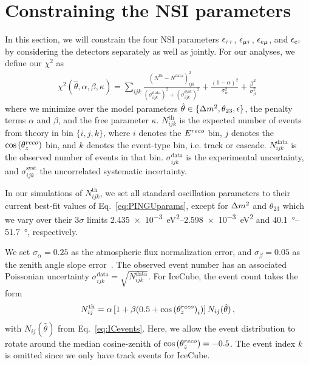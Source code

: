 \section{Constraining the NSI parameters}\label{sec:constraining}
In this section, we will constrain the four NSI parameters $\epsilon_{\tau\tau}$, $\epsilon_{\mu\tau}$, $\epsilon_{e\mu}$, and $\epsilon_{e\tau}$ by considering the detectors separately as well as jointly.
For our analyses, we define our $\chi^2$ as
\begin{align}\label{eq:chisq_NSI}
    \chi^{2}(\hat{\theta},\alpha,\beta, \kappa)=\sum_{ijk} \frac{\left(N^\text{th}-N^\text{data}\right)_{ijk}^{2}}
    {\left(\sigma^\text{data}_{ijk}\right)^{2} + \left(\sigma^\text{syst}_{ijk}\right)^{2}}+ 
    \frac{(1-\alpha)^2}{\sigma_\alpha^2} + \frac{\beta^2}{\sigma_\beta^2}\,
\end{align}
where we minimize over the model parameters $\hat{\theta} \in \{\dm, \theta_{23}, \epsilon\}$, the penalty terms $\alpha$ and $\beta$, and the free parameter $\kappa$.
$N_{ijk}^\text{th}$ is the expected number of events from theory in bin $\{i,j,k\}$, where $i$ denotes the $E^{reco}$ bin, $j$ denotes the $\cos{(\theta_z^{reco})}$ bin,
and $k$ denotes the event-type bin, i.e. track or cascade. 
$N_{ijk}^\text{data}$ is the observed number of events in that bin. $\sigma^\text{data}_{ijk}$ is the experimental uncertainty, and $\sigma^\text{syst}_{ijk}$ the uncorrelated systematic
incertainty.

In our simulations of $N_{ijk}^\text{th}$, we set all standard oscillation parameters to their current best-fit values of Eq.~\ref{eq:PINGUparams}, 
except for $\dm$ and $\theta_{23}$
which we vary over their $3\sigma$ limits \SIrange{2.435e-3}{2.598e-3}{\eV\squared} and \SIrange{40.1}{51.7}{\degree}, respectively.

We set $\sigma_\alpha = 0.25$ as the atmospheric flux normalization error, and $\sigma_\beta = 0.05$ as the zenith angle slope error~\cite{hondapaper}. 
The observed event number has an associated Poissonian uncertainty $\sigma_{ijk}^\text{data} = \sqrt{N_{ijk}^\text{data}}$.
For IceCube, the event count takes the form
\begin{align}
    N^\text{th}_{ij} = \alpha\left[1+\beta (0.5 + \cos{(\theta_z^{reco})}_i )\right] N_{ij}(\hat{\theta})\,,
\end{align}
with $N_{ij}(\hat{\theta})$ from Eq.~\ref{eq:ICevents}. Here, we allow the event distribution to rotate around the median cosine-zenith of $\cos{(\theta_z^{reco})} = -0.5$. 
The event index $k$ is omitted since we only have track events for IceCube.

